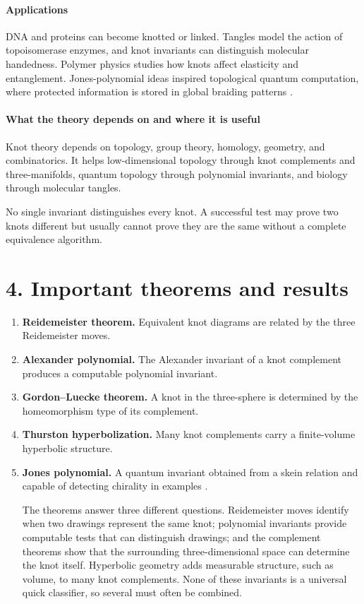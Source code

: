 \paragraph{Applications}
DNA and proteins can become knotted or linked. Tangles model the action of topoisomerase enzymes, and knot invariants can distinguish molecular handedness. Polymer physics studies how knots affect elasticity and entanglement. Jones-polynomial ideas inspired topological quantum computation, where protected information is stored in global braiding patterns \cite{knot_theory_ref3}.

\paragraph{What the theory depends on and where it is useful}
Knot theory depends on topology, group theory, homology, geometry, and combinatorics. It helps low-dimensional topology through knot complements and three-manifolds, quantum topology through polynomial invariants, and biology through molecular tangles.

No single invariant distinguishes every knot. A successful test may prove two knots different but usually cannot prove they are the same without a complete equivalence algorithm.

\section*{4. Important theorems and results}
\begin{enumerate}[leftmargin=*,itemsep=0.35em]
\item \textbf{Reidemeister theorem.} Equivalent knot diagrams are related by the three Reidemeister moves.

\item \textbf{Alexander polynomial.} The Alexander invariant of a knot complement produces a computable polynomial invariant.

\item \textbf{Gordon--Luecke theorem.} A knot in the three-sphere is determined by the homeomorphism type of its complement.

\item \textbf{Thurston hyperbolization.} Many knot complements carry a finite-volume hyperbolic structure.

\item \textbf{Jones polynomial.} A quantum invariant obtained from a skein relation and capable of detecting chirality in examples \cite{knot_theory_ref4}.

The theorems answer three different questions. Reidemeister moves identify when two drawings represent the same knot; polynomial invariants provide computable tests that can distinguish drawings; and the complement theorems show that the surrounding three-dimensional space can determine the knot itself. Hyperbolic geometry adds measurable structure, such as volume, to many knot complements. None of these invariants is a universal quick classifier, so several must often be combined.
\end{enumerate}

